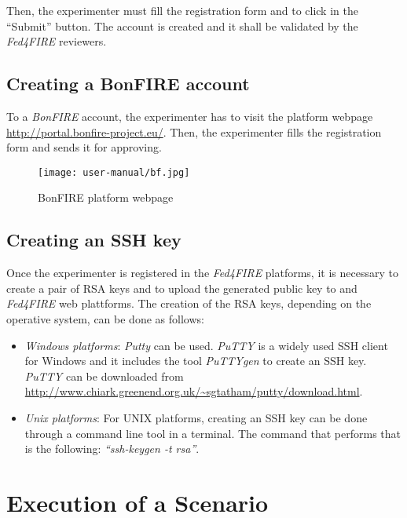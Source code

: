 Then, the experimenter must fill the registration form and to click in the ``Submit''
button. The account is created and it shall be validated by the \emph{Fed4FIRE}
reviewers. 

\subsection{Creating a BonFIRE account}

To a \emph{BonFIRE} account, the experimenter has to visit the platform webpage
\url{http://portal.bonfire-project.eu/}. Then, the experimenter fills the
registration form and sends it for approving. 

\begin{figure}[!h]
\begin{center}
\texttt{[image: user-manual/bf.jpg]}
\caption{BonFIRE platform webpage}
\label{fig:bonfire-account}
\end{center}
\end{figure}

\subsection{Creating an SSH key}

Once the experimenter is registered in the \emph{Fed4FIRE} platforms, it is
necessary to create a pair of \ac{RSA} keys and to upload the generated public key to
\bonfire and \emph{Fed4FIRE} web plattforms. The creation of the \ac{RSA} keys,
depending on the operative system, can be done as follows:
\begin{itemize}
\item \emph{Windows platforms}: \emph{Putty} can be used. \emph{PuTTY} is a widely
  used \ac{SSH} client for Windows and it includes the tool \emph{PuTTYgen} to create
  an \ac{SSH} key. \emph{PuTTY} can be downloaded from
  \url{http://www.chiark.greenend.org.uk/~sgtatham/putty/download.html}.

\item \emph{Unix platforms}: For UNIX platforms, creating an \ac{SSH} key can be
  done through a command line tool in a terminal. The command that
  performs that is the following: \emph{``ssh-keygen -t rsa''}.

\end{itemize}


\section{Execution of a Scenario}

